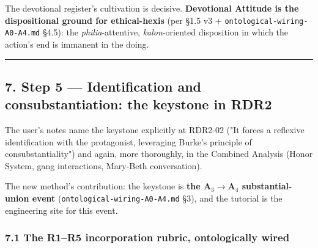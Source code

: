\documentclass[11pt]{report}
\begin{document}
The devotional register's cultivation is decisive. \textbf{Devotional Attitude is the dispositional ground for ethical-hexis} (per §1.5 v3 + \texttt{ontological-\discretionary{}{}{}wiring-\discretionary{}{}{}A0-\discretionary{}{}{}A4.\discretionary{}{}{}md} §4.5): the \textit{philia}-attentive, \textit{kalon}-oriented disposition in which the action's end is immanent in the doing.


\vspace{0.4em}\hrule\vspace{0.8em}


\subsection{7. Step 5 — Identification and consubstantiation: the keystone in RDR2}


The user's notes name the keystone explicitly at RDR2-02 ("It forces a reflexive identification with the protagonist, leveraging Burke's principle of consubstantiality") and again, more thoroughly, in the Combined Analysis (Honor System, gang interactions, Mary-Beth conversation).


The new method's contribution: the keystone is \textbf{the A$_3$$\rightarrow$\allowbreak A$_4$ substantial-union event} (\texttt{ontological-\discretionary{}{}{}wiring-\discretionary{}{}{}A0-\discretionary{}{}{}A4.\discretionary{}{}{}md} §3), and the tutorial is the engineering site for this event.


\subsubsection{7.1 The R1–R5 incorporation rubric, ontologically wired}
\end{document}
